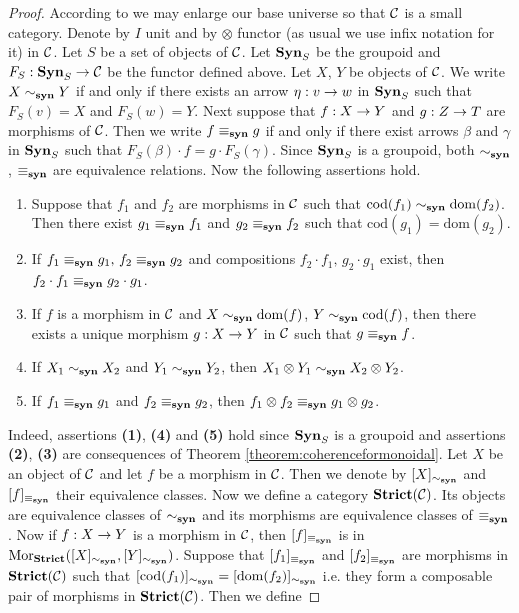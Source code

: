 \begin{proof}
According to {\cite[Introduction]{Presheaves}} we may enlarge our base universe so that ${\mathcal C}$ is a small category. Denote by $I$ unit and by $\otimes$ functor (as usual we use infix notation for it) in ${\mathcal C}$. Let $S$ be a set of objects of ${\mathcal C}$. Let $\mathbf{Syn}_S$ be the groupoid and $F_S:\mathbf{Syn}_S\rightarrow {\mathcal C}$ be the functor defined above. Let $X$, $Y$ be objects of ${\mathcal C}$. We write $X\sim_{\mathbf{syn}}Y$ if and only if there exists an arrow $\eta:v\rightarrow w$ in $\mathbf{Syn}_S$ such that $F_S(v)=X$ and $F_S(w)=Y$. Next suppose that $f:X\rightarrow Y$ and $g:Z\rightarrow T$ are morphisms of ${\mathcal C}$. Then we write $f \equiv_{\mathbf{syn}}g$ if and only if there exist arrows $\beta$ and $\gamma$ in $\mathbf{Syn}_S$ such that $F_S(\beta)\cdot f = g\cdot F_S(\gamma)$. Since $\mathbf{Syn}_S$ is a groupoid, both $\sim_{\mathbf{syn}}$, $\equiv_{\mathbf{syn}}$ are equivalence relations. Now the following assertions hold.
\begin{enumerate}[label=\textbf{(\arabic*)}, leftmargin=1.5em]
\item Suppose that $f_1$ and $f_2$ are morphisms in ${\mathcal C}$ such that $\mathrm{cod}(f_1) \sim_{\mathbf{syn}} \mathrm{dom}(f_2)$. Then there exist $g_1 \equiv_{\mathbf{syn}} f_1$ and $g_2\equiv_{\mathbf{syn}} f_2$ such that $\mathrm{cod}(g_1)=\mathrm{dom}(g_2)$. 
\item If $f_1\equiv_{\mathbf{syn}} g_1,\, f_2\equiv_{\mathbf{syn}} g_2$ and compositions $f_2\cdot f_1,\,g_2\cdot g_1$ exist, then $f_2\cdot f_1\equiv_{\mathbf{syn}}g_2\cdot g_1$.
\item If $f$ is a morphism in ${\mathcal C}$ and $X\sim_{\mathbf{syn}} \mathrm{dom}(f)$, $Y\sim_{\mathbf{syn}} \mathrm{cod}(f)$, then there exists a unique morphism $g:X\rightarrow Y$ in ${\mathcal C}$ such that $g \equiv_{\mathbf{syn}} f$.
\item If $X_1\sim_{\mathbf{syn}}X_2$ and $Y_1\sim_{\mathbf{syn}} Y_2$, then $X_1\otimes Y_1 \sim_{\mathbf{syn}} X_2\otimes Y_2$. 
\item If $f_1\equiv_{\mathbf{syn}} g_1$ and $f_2\equiv_{\mathbf{syn}} g_2$, then $f_1\otimes f_2 \equiv_{\mathbf{syn}} g_1\otimes g_2$.
\end{enumerate}
Indeed, assertions \textbf{(1)}, \textbf{(4)} and \textbf{(5)} hold since $\mathbf{Syn}_S$ is a groupoid and assertions \textbf{(2)}, \textbf{(3)} are consequences of Theorem \ref{theorem:coherenceformonoidal}. Let $X$ be an object of ${\mathcal C}$ and let $f$ be a morphism in ${\mathcal C}$. Then we denote by $[X]_{\sim_{\mathbf{syn}}}$ and $[f]_{\equiv_{\mathbf{syn}}}$ their equivalence classes. Now we define a category $\mathbf{Strict}({\mathcal C})$.  Its objects are equivalence classes of $\sim_{\mathbf{syn}}$ and its morphisms are equivalence classes of $\equiv_{\mathbf{syn}}$. Now if $f:X\rightarrow Y$ is a morphism in ${\mathcal C}$, then $[f]_{\equiv_{\mathbf{syn}}}$ is in $\mathrm{Mor}_{\mathbf{Strict}}([X]_{\sim_{\mathbf{syn}}},[Y]_{\sim_{\mathbf{syn}}})$. Suppose that $[f_1]_{\equiv_{\mathbf{syn}}}$ and $[f_2]_{\equiv_{\mathbf{syn}}}$ are morphisms in $\mathbf{Strict}({\mathcal C})$ such that $[\mathrm{cod}(f_1)]_{\sim_{\mathbf{syn}}} = [\mathrm{dom}(f_2)]_{\sim_{\mathbf{syn}}}$ i.e. they form a composable pair of morphisms in $\mathbf{Strict}({\mathcal C})$. Then we define

\end{proof}
